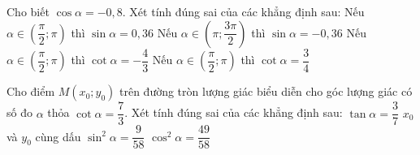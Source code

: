\begin{ex}%
	Cho biết $\cos \alpha=-0{,}8$. Xét tính đúng sai của các khẳng định sau:
	\choiceTF
	{Nếu $\alpha \in \left(\dfrac{\pi}{2};\pi \right)$ thì $\sin \alpha=0{,}36$}
	{Nếu $\alpha \in \left(\pi;\dfrac{3\pi}{2} \right)$ thì $\sin \alpha=-0{,}36$}
	{\True Nếu $\alpha \in \left(\dfrac{\pi}{2};\pi \right)$ thì $\cot \alpha=-\dfrac{4}{3}$}
	{Nếu $\alpha \in \left(\dfrac{\pi}{2};\pi \right)$ thì $\cot \alpha=\dfrac{3}{4}$}
\end{ex}

\begin{ex}%
	Cho điểm $M (x_0;y_0)$ trên đường tròn lượng giác biểu diễn cho góc lượng giác có số đo $\alpha$ thỏa $\cot \alpha=\dfrac{7}{3}$. Xét tính đúng sai của các khẳng định sau:
	\choiceTF
	{\True $\tan\alpha=\dfrac{3}{7}$}
	{\True $x_0$ và $y_0$ cùng dấu}
	{\True $\sin^2 \alpha=\dfrac{9}{58}$}
	{\True $\cos^2 \alpha=\dfrac{49}{58}$}
\end{ex}

